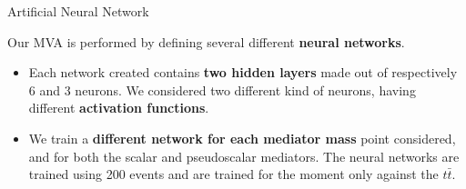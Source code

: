 \documentclass[8 pt]{beamer}
\begin{document}
\begin{frame}{Artificial Neural Network}

	\justifying
	Our MVA is performed by defining several different \textbf{neural networks}.
	\begin{itemize}
	\justifying
	\item Each network created contains \textbf{two hidden layers} made out of respectively 6 and 3 neurons. We considered two different kind of neurons, having different \textbf{activation functions}. %
	\item We train a \textbf{different network for each mediator mass} point considered, and for both the scalar and pseudoscalar mediators. The neural networks are trained using 200 events and are trained for the moment only against the $t \bar t$.
	\end{itemize} \vfill


\end{frame}
\end{document}
